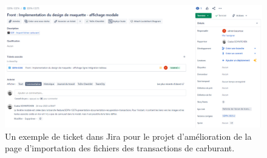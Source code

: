 \begin{appendices}
    \begin{figure}[ht]
        \centering
        \includegraphics[width=\textwidth]{img/ticket}
        \caption{Un exemple de ticket dans Jira pour le projet d'amélioration de la page d'importation des fichiers des transactions de carburant.}
        \label{fig:ticket}
    \end{figure}


\end{appendices}
